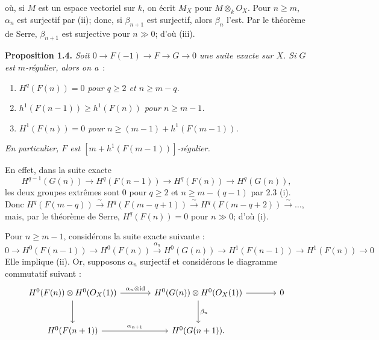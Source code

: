 
où, si \(M\) est un
espace vectoriel sur \(k\), on écrit \(M_X\) pour \(M\otimes_k{O}_X\). Pour \(n\ge m\), \(\alpha_n\) est surjectif par (ii); donc, si \(\beta_{n+1}\) est surjectif, alors \(\beta_n\) l'est. Par le théorème de Serre, \(\beta_{n+1}\) est surjective pour \(n\gg0\); d'où (iii).

\textbf{Proposition 1.4.} \emph{Soit \(0\to F(-1)\to F\to G\to0\) une suite exacte sur \(X\). Si \(G\) est \(m\)-régulier, alors on a}~:
\begin{enumerate}[label=(\roman*)]
\item \emph{\(H^q(F(n))=0\) pour \(q\ge2\) et \(n\ge m-q\).}
\item \emph{\(h^1(F(n-1))\ge h^1(F(n))\) pour \(n\ge m-1\).}
\item \emph{\(H^1(F(n))=0\) pour \(n\ge (m-1)+h^1(F(m-1))\).}
\end{enumerate}
\emph{En particulier, \(F\) est \([m+h^1(F(m-1))]\)-régulier.}

En effet, dans la suite exacte
\[
H^{q-1}(G(n))\longrightarrow H^q(F(n-1))\longrightarrow H^q(F(n))\longrightarrow H^q(G(n)),
\]
les deux groupes extrêmes sont \(0\) pour \(q\ge2\) et \(n\ge m-(q-1)\) par 2.3 (i). Donc \(H^q(F(m-q))\xrightarrow{\sim}H^q(F(m-q+1))\xrightarrow{\sim}H^q(F(m-q+2))\xrightarrow{\sim}\ldots\), mais, par le théorème de Serre, \(H^q(F(n))=0\) pour \(n\gg0\); d'où (i).

Pour \(n\ge m-1\), considérons la suite exacte suivante :
\[
0\to H^0(F(n-1))\to H^0(F(n))
  \xrightarrow{\alpha_n}H^0(G(n))\to H^1(F(n-1))
  \to H^1(F(n))\to0
\]
Elle implique (ii). Or, supposons \(\alpha_n\) surjectif et considérons le diagramme commutatif suivant :
\[
\begin{tikzcd}[column sep=large,row sep=large]
H^0(F(n))\otimes H^0({O}_X(1))
  \arrow[r,"\alpha_n\otimes\mathrm{id}"]
  \arrow[d]
& H^0(G(n))\otimes H^0({O}_X(1))
  \arrow[r]
  \arrow[d,"\beta_n"]
& 0 \\
H^0(F(n+1))
  \arrow[r,"\alpha_{n+1}"]
& H^0(G(n+1)).
\end{tikzcd}
\]
